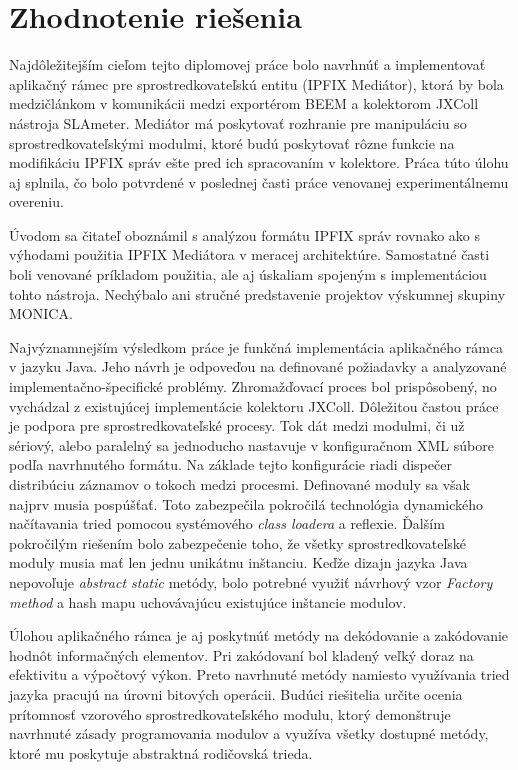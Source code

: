 \section{Zhodnotenie rie\v{s}enia}

Najdôležitejším cieľom tejto diplomovej práce bolo navrhnúť a implementovať aplikačný rámec pre 
sprostredkovateľskú entitu (IPFIX Mediátor), ktorá by bola medzičlánkom v komunikácii medzi exportérom
BEEM a kolektorom JXColl nástroja SLAmeter. Mediátor má poskytovať rozhranie pre manipuláciu so 
sprostredkovateľskými modulmi, ktoré budú poskytovať rôzne funkcie na modifikáciu IPFIX správ ešte pred ich 
spracovaním v kolektore. Práca túto úlohu aj splnila, čo bolo potvrdené v poslednej časti 
práce venovanej experimentálnemu overeniu.

Úvodom sa čitateľ oboznámil s analýzou formátu IPFIX správ rovnako ako s výhodami použitia 
IPFIX Mediátora v meracej architektúre. Samostatné časti boli venované príkladom použitia, ale aj 
úskaliam spojeným s implementáciou tohto nástroja. Nechýbalo ani stručné predstavenie projektov výskumnej 
skupiny MONICA.

Najvýznamnejším výsledkom práce je funkčná implementácia aplikačného rámca v jazyku Java. Jeho návrh je 
odpoveďou na definované požiadavky a analyzované implementačno-špecifické problémy. Zhromažďovací proces 
bol prispôsobený, no vychádzal z existujúcej implementácie kolektoru JXColl. Dôležitou častou práce je 
podpora pre sprostredkovateľské procesy. Tok dát medzi modulmi, či už sériový, alebo paralelný sa  
jednoducho nastavuje v konfiguračnom XML súbore podľa navrhnutého formátu. Na základe tejto konfigurácie 
riadi dispečer distribúciu záznamov o tokoch medzi procesmi. Definované moduly sa však najprv musia 
pospúšťať. Toto zabezpečila pokročilá technológia dynamického načítavania tried pomocou 
systémového \emph{class loadera} a reflexie. Ďalším pokročilým riešením bolo zabezpečenie toho, že 
všetky sprostredkovateľské moduly musia mať len jednu unikátnu inštanciu. Keďže dizajn jazyka Java 
nepovoľuje \emph{abstract static} metódy, bolo potrebné využiť návrhový vzor \emph{Factory method} a 
hash mapu uchovávajúcu existujúce inštancie modulov. 

Úlohou aplikačného rámca je aj poskytnúť metódy na dekódovanie a zakódovanie hodnôt informačných elementov.
Pri zakódovaní bol kladený veľký doraz na efektivitu a výpočtový výkon. Preto navrhnuté metódy namiesto 
využívania tried jazyka pracujú na úrovni bitových operácii. Budúci riešitelia určite ocenia prítomnosť
vzorového sprostredkovateľského modulu, ktorý demonštruje navrhnuté zásady programovania modulov a 
využíva všetky dostupné metódy, ktoré mu poskytuje abstraktná rodičovská trieda. 

